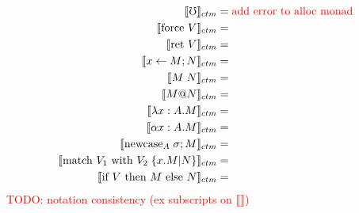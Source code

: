 \documentclass{article}
\makeatletter
\newcommand{\den}[1]{\llbracket #1 \rrbracket}
\newcommand{\red}[1]{\textcolor{red}{#1}}
\newcommand{\err}{\mho}
\newcommand{\force}[1]{\textrm{force }#1}
\newcommand{\ret}[1]{\textrm{ret }#1}
\newcommand{\bind}[3]{#1 \leftarrow #2 ; #3}
\newcommand{\newcase}[3]{\textrm{newcase}_{#1} \; #2 ; #3}
\newcommand{\match}[5]{\textrm{match }#1 \textrm{ with }#2 \;\{#3 . #4 | #5\}}
\newcommand{\ite}[3]{\textrm{if }#1 \textrm{ then }#2 \textrm{ else }#3}
\newcommand{\at}{\textrm{@}}
\makeatother
\begin{document}
\begin{align*}
    \llbracket \err \rrbracket_{ctm} &= \red{\textrm{add error to alloc monad}}\\
    \llbracket \force{V} \rrbracket_{ctm} &= \\
    \llbracket \ret{V} \rrbracket_{ctm} &= \\
    \llbracket \bind{x}{M}{N} \rrbracket_{ctm} &= \\
    \llbracket M \; N \rrbracket_{ctm} &= \\
    \llbracket M \at N \rrbracket_{ctm} &= \\
    \llbracket \lambda x : A . M \rrbracket_{ctm} &=  \\
    \llbracket \alpha x : A . M \rrbracket_{ctm} &= \\
    \llbracket \newcase{A}{\sigma}{M} \rrbracket_{ctm} &= \\
    \llbracket \match{V_1}{V_2}{x}{M}{N}\rrbracket_{ctm} &= \\
    \llbracket \ite{V}{M}{N} \rrbracket_{ctm} &= \\
\end{align*}
\red{TODO: notation consistency (ex subscripts on $\den{}$)}



\end{document}
